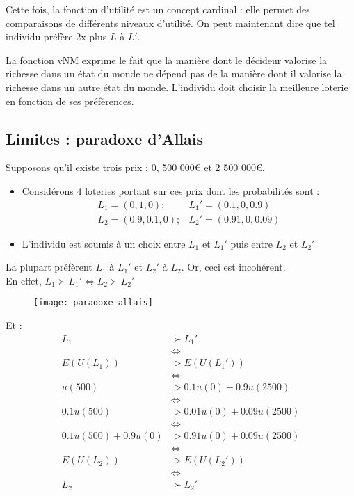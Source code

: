 Cette fois, la fonction d'utilité est un concept cardinal : elle permet des comparaisons de différents niveaux d'utilité. On peut maintenant dire que tel individu préfère 2x plus $L$ à $L'$.

La fonction vNM exprime le fait que la manière dont le décideur valorise la richesse dans un état du monde ne dépend pas de la manière dont il valorise la richesse dans un autre état du monde. L'individu doit choisir la meilleure loterie en fonction de ses préférences.

\subsection{Limites : paradoxe d'Allais}

Supposons qu'il existe trois prix : 0, 500 000€ et 2 500 000€.
\begin{itemize}
\item Considérons 4 loteries portant sur ces prix dont les probabilités sont :
	\begin{align*}
	L_1 = (0, 1, 0); &L_1' = (0.1, 0, 0.9)\\
	L_2 = (0.9, 0.1, 0); &L_2' = (0.91, 0, 0.09)
	\end{align*}
\item L'individu est soumis à un choix entre $L_1$ et $L_1'$ puis entre $L_2$ et $L_2'$
\end{itemize}

\begin{minipage}{0.65\textwidth}
	La plupart préfèrent $L_1$ à $L_1'$ et $L_2'$ à $L_2$. Or, ceci est incohérent.\\
	En effet, $L_1 \succ L_1' \Leftrightarrow L_2 \succ L_2'$
\end{minipage}
\begin{minipage}{0.3\textwidth}
	\begin{figure}[H]
		\centering
		\texttt{[image: paradoxe\_allais]}
	\end{figure}
\end{minipage}

Et :
\begin{align*}
L_1 &\succ L_1'\\
&\Leftrightarrow\\
E(U(L_1)) &> E(U(L_1'))\\
&\Leftrightarrow\\
u(500) &> 0.1u(0) + 0.9u(2500)\\
&\Leftrightarrow\\
0.1u(500) &> 0.01u(0) + 0.09u(2500)\\
&\Leftrightarrow\\
0.1u(500)+0.9u(0) &> 0.91u(0) + 0.09u(2500)\\
&\Leftrightarrow\\
E(U(L_2)) &> E(U(L_2'))\\
&\Leftrightarrow\\
L_2 &\succ L_2'
\end{align*}

